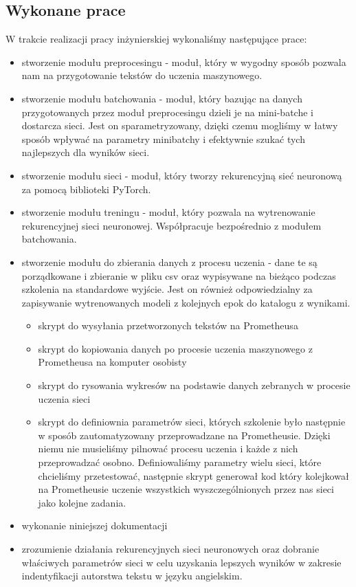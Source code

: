 \subsection{Wykonane prace}
W trakcie realizacji pracy inżynierskiej wykonaliśmy następujące prace:
\begin{itemize}
  \item stworzenie modułu preprocesingu - moduł, który w wygodny sposób pozwala nam na przygotowanie tekstów 
  do uczenia maszynowego. 
  \item stworzenie modułu batchowania - moduł, który bazując na danych przygotowanych przez moduł 
  preprocesingu dzieli je na mini-batche i dostarcza sieci. Jest on sparametryzowany, dzięki czemu mogliśmy
  w łatwy sposób wpływać na parametry minibatchy i efektywnie szukać tych najlepszych dla wyników sieci. 
  \item stworzenie modułu sieci - moduł, który tworzy rekurencyjną sieć neuronową za pomocą
  biblioteki PyTorch.
  \item stworzenie modułu treningu - moduł, który pozwala na wytrenowanie rekurencyjnej sieci neuronowej. 
  Współpracuje bezpośrednio z modułem batchowania.
  \item stworzenie modułu do zbierania danych z procesu uczenia - dane te są porządkowane i 
  zbieranie w pliku csv oraz wypisywane na bieżąco podczas szkolenia na standardowe wyjście. 
  Jest on również odpowiedzialny za zapisywanie wytrenowanych modeli z kolejnych epok do katalogu z wynikami.
  \begin{itemize}
    \item skrypt do wysyłania przetworzonych tekstów na Prometheusa 
    \item skrypt do kopiowania danych po procesie uczenia maszynowego z Prometheusa na komputer osobisty
    \item skrypt do rysowania wykresów na podstawie danych zebranych w procesie uczenia sieci
    \item skrypt do definiownia parametrów sieci, których szkolenie było następnie w sposób zautomatyzowany
     przeprowadzane na Prometheusie. Dzięki niemu nie musieliśmy pilnować procesu uczenia i 
   	każde z nich przeprowadzać osobno. Definiowaliśmy parametry wielu sieci, które chcieliśmy przetestować,
   	następnie skrypt generował kod który kolejkował na Prometheusie uczenie wszystkich wyszczególnionych przez nas sieci 
   	jako kolejne zadania.
  \end{itemize}
  \item wykonanie niniejszej dokumentacji
  \item zrozumienie działania rekurencyjnych sieci neuronowych oraz dobranie właściwych parametrów sieci 
  w celu uzyskania lepszych wyników w zakresie indentyfikacji autorstwa tekstu w języku angielskim.
\end{itemize}


